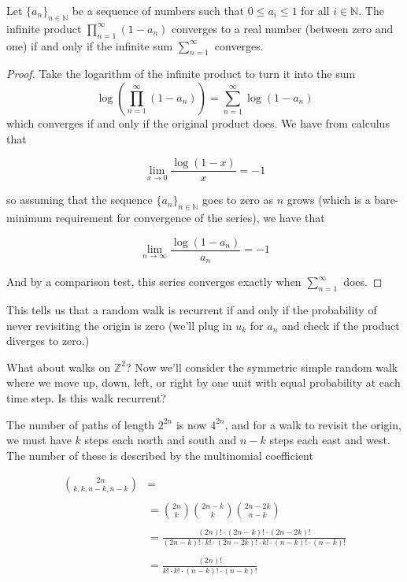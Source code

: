 \begin{claim}
	
	Let $\{a_n\}_{n\in\mathbb{N}}$ be a sequence of numbers such that $0\leq a_i\leq 1$ for all $i\in\mathbb{N}$.  The infinite product $\prod\limits_{n=1}^{\infty} (1-a_n)$ converges to a real number (between zero and one) if and only if the infinite sum $\sum\limits_{n=1}^{\infty}$ converges.
	
	
	
\end{claim}

\begin{proof}
	
	Take the logarithm of the infinite product to turn it into the sum 
	$$\log{(\prod\limits_{n=1}^{\infty} (1-a_n))} = \sum\limits_{n=1}^{\infty} \log{(1-a_n)}$$
	which converges if and only if the original product does.  We have from calculus that 
	
	$$\lim\limits_{x\rightarrow 0} \frac{\log{(1-x)}}{x}=-1$$
	
	so assuming that the sequence $\{ a_n \}_{n\in\mathbb{N}}$ goes to zero as $n$ grows (which is a bare-minimum requirement for convergence of the series), we have that 
		
		$$\lim\limits_{n\rightarrow \infty} \frac{\log{(1-a_n)}}{a_n}=-1$$
	
	
	And by a comparison test, this series converges exactly when  $\sum\limits_{n=1}^{\infty}$ does.
\end{proof}

This tells us that a random walk is recurrent if and only if the probability of never revisiting the origin is zero (we'll plug in $u_k$ for $a_n$ and check if the product diverges to zero.)

What about walks on $\mathbb{Z}^2$?  Now we'll consider the symmetric simple random walk where we move up, down, left, or right by one unit with equal probability at each time step.  Is this walk recurrent?

The number of paths of length $2^{2n}$ is now $4^{2n}$, and for a walk to revisit the origin, we must have $k$ steps each north and south and $n-k$ steps each east and west.  The number of these is described by the multinomial coefficient

\begin{align*}
\binom{2n}{k,k,n-k,n-k} &= \\
\ \\
&=\binom{2n}{k}\binom{2n-k}{k}\binom{2n-2k}{n-k} \\
\ \\
&= \frac{(2n)!\cdot (2n-k)!\cdot (2n-2k)!}{(2n-k)!\cdot k!\cdot (2n-2k)!\cdot k!\cdot (n-k)!\cdot (n-k)!} \\
\ \\
&= \frac{(2n)!}{k!\cdot k!\cdot (n-k)!\cdot (n-k)!}
\end{align*}

